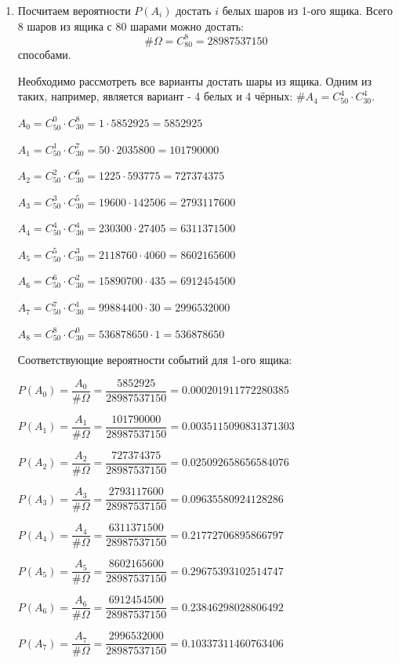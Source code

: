 \begin{enumerate}
	\item Посчитаем вероятности $P(A_i)$ достать $i$ белых шаров из 1-ого ящика. Всего 8 шаров из ящика с 80 шарами можно достать:
	\[ \# \Omega = C_{80}^8 = 28987537150 \]
	способами.
	
	Необходимо рассмотреть все варианты достать шары из ящика. Одним из таких, например, является вариант - 4 белых и 4 чёрных: $\# A_4 = C_{50}^4 \cdot C_{30}^4$.
	
	$A_0 = C_{50}^0 \cdot C_{30}^8 = 1 \cdot 5852925 = 5852925$
	
	$A_1 = C_{50}^1 \cdot C_{30}^7 = 50 \cdot 2035800 = 101790000$
	
	$A_2 = C_{50}^2 \cdot C_{30}^6 = 1225 \cdot 593775 = 727374375$
	
	$A_3 = C_{50}^3 \cdot C_{30}^5 = 19600 \cdot 142506 = 2793117600$
	
	$A_4 = C_{50}^4 \cdot C_{30}^4 = 230300 \cdot 27405 = 6311371500$
	
	$A_5 = C_{50}^5 \cdot C_{30}^3 = 2118760 \cdot 4060 = 8602165600$
	
	$A_6 = C_{50}^6 \cdot C_{30}^2 = 15890700 \cdot 435 = 6912454500$
	
	$A_7 = C_{50}^7 \cdot C_{30}^1 = 99884400 \cdot 30 = 2996532000$
	
	$A_8 = C_{50}^8 \cdot C_{30}^0 = 536878650 \cdot 1 = 536878650$
	
	Соответствующие вероятности событий для 1-ого ящика:
	
	$P(A_0) = \dfrac{A_0}{\# \Omega} = \dfrac{5852925}{28987537150} = 0.000201911772280385$
	
	$P(A_1) = \dfrac{A_1}{\# \Omega} = \dfrac{101790000}{28987537150} = 0.0035115090831371303$
	
	$P(A_2) = \dfrac{A_2}{\# \Omega} = \dfrac{727374375}{28987537150} = 0.025092658656584076$
	
	$P(A_3) = \dfrac{A_3}{\# \Omega} = \dfrac{2793117600}{28987537150} = 0.09635580924128286$
	
	$P(A_4) = \dfrac{A_4}{\# \Omega} = \dfrac{6311371500}{28987537150} = 0.21772706895866797$
	
	$P(A_5) = \dfrac{A_5}{\# \Omega} = \dfrac{8602165600}{28987537150} = 0.29675393102514747$
	
	$P(A_6) = \dfrac{A_6}{\# \Omega} = \dfrac{6912454500}{28987537150} = 0.23846298028806492$
	
	$P(A_7) = \dfrac{A_7}{\# \Omega} = \dfrac{2996532000}{28987537150} = 0.10337311460763406$
	

\end{enumerate}
